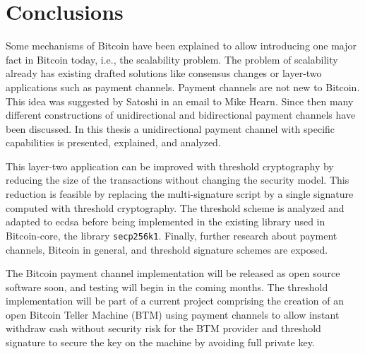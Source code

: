 \chapter{Conclusions}
\label{chap:conclusions}

Some mechanisms of Bitcoin have been explained to allow introducing one major
fact in Bitcoin today, i.e., the scalability problem. The problem of scalability
already has existing drafted solutions like consensus changes or layer-two
applications such as payment channels. Payment channels are not new to Bitcoin.
This idea was suggested by Satoshi in an email to Mike Hearn. Since then many
different constructions of unidirectional and bidirectional payment channels
have been discussed. In this thesis a unidirectional payment channel with
specific capabilities is presented, explained, and analyzed.

This layer-two application can be improved with threshold cryptography by
reducing the size of the transactions without changing the security model. This
reduction is feasible by replacing the multi-signature script by a single
signature computed with threshold cryptography. The threshold scheme is analyzed
and adapted to \gls{ecdsa} before being implemented in the existing library used
in Bitcoin-core, the library \texttt{secp256k1}. Finally, further research about
payment channels, Bitcoin in general, and threshold signature schemes are
exposed.

The Bitcoin payment channel implementation will be released as open source
software soon, and testing will begin in the coming months. The threshold
implementation will be part of a current project comprising the creation of an
open Bitcoin Teller Machine (BTM) using payment channels to allow instant
withdraw cash without security risk for the BTM provider and threshold signature
to secure the key on the machine by avoiding full private key.
